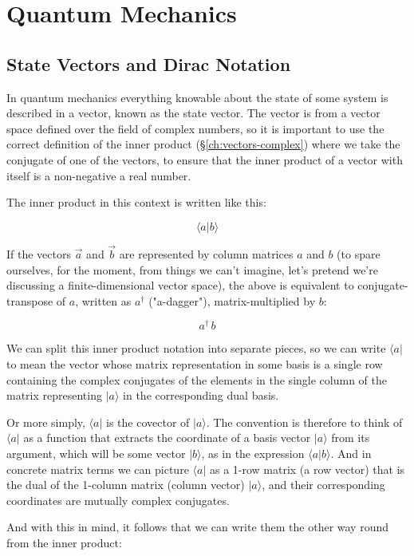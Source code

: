 \chapter{Quantum Mechanics} \label{ch:qm}

\section{State Vectors and Dirac Notation}

In quantum mechanics everything knowable about the state of some system is described in a vector, known as the state vector. The vector is from a vector space defined over the field of complex numbers, so it is important to use the correct definition of the inner product (§\ref{ch:vectors-complex}) where we take the conjugate of one of the vectors, to ensure that the inner product of a vector with itself is a non-negative a real number.

The inner product in this context is written like this:

$$\langle a|b \rangle$$

If the vectors $\vec{a}$ and $\vec{b}$ are represented by column matrices $a$ and $b$ (to spare ourselves, for the moment, from things we can't imagine, let's pretend we're discussing a finite-dimensional vector space), the above is equivalent to conjugate-transpose of $a$, written as $a^{\dagger}$ ("a-dagger"), matrix-multiplied by $b$:

$$a^{\dagger} \, b$$

We can split this inner product notation into separate pieces, so we can write $\langle a|$ to mean the vector whose matrix representation in some basis is a single row containing the complex conjugates of the elements in the single column of the matrix representing $|a \rangle$ in the corresponding dual basis.

Or more simply, $\langle a|$ is the covector of $|a \rangle$. The convention is therefore to think of $\langle a|$ as a function that extracts the coordinate of a basis vector $|a \rangle$ from its argument, which will be some vector $|b \rangle$, as in the expression $\langle a|b \rangle$. And in concrete matrix terms we can picture $\langle a|$ as a 1-row matrix (a row vector) that is the dual of the 1-column matrix (column vector) $|a \rangle$, and their corresponding coordinates are mutually complex conjugates.

And with this in mind, it follows that we can write them the other way round from the inner product:


